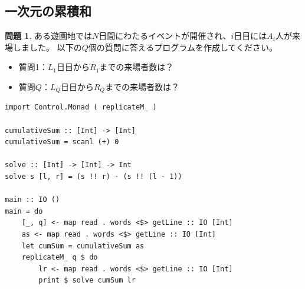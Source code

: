 \documentclass[12pt,a4paper,dvipdfmx,fleqn]{article}%
\theoremstyle{definition}
\newtheorem*{toi*}{問題}
\theoremstyle{definition}
\theoremstyle{definition}
\begin{document}
\subsection{一次元の累積和}\label{一次元の累積和}
\begin{toi*}
    ある遊園地では$N$日間にわたるイベントが開催され、$i$日目には$A_i$人が来場しました。
    以下の$Q$個の質問に答えるプログラムを作成してください。
    \begin{itemize}
        \item [] 質問1：$L_1$日目から$R_1$までの来場者数は？\\[2mm]
        \hspace{2em}{\vdots}
        \item [] 質問$Q$：$L_Q$日目から$R_Q$までの来場者数は？
    \end{itemize}
\end{toi*}
\begin{lstlisting}[caption=A06\_00.hs,label=A06_00]
import Control.Monad ( replicateM_ )

cumulativeSum :: [Int] -> [Int]
cumulativeSum = scanl (+) 0

solve :: [Int] -> [Int] -> Int
solve s [l, r] = (s !! r) - (s !! (l - 1))

main :: IO ()
main = do
    [_, q] <- map read . words <$> getLine :: IO [Int]
    as <- map read . words <$> getLine :: IO [Int]
    let cumSum = cumulativeSum as
    replicateM_ q $ do
        lr <- map read . words <$> getLine :: IO [Int]
        print $ solve cumSum lr
\end{lstlisting}
\end{document}
